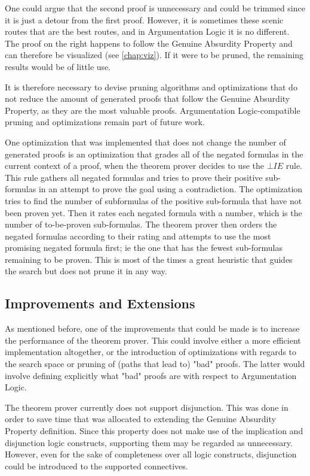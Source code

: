 \documentclass[11pt,twoside,a4paper]{report}
\begin{document}
One could argue that the second proof is unnecessary and could be trimmed since it is just a detour from the first proof. However, it is sometimes these scenic routes that are the best routes, and in Argumentation Logic it is no different. The proof on the right happens to follow the Genuine Absurdity Property and can therefore be visualized (see \autoref{chap:viz}). If it were to be pruned, the remaining results would be of little use.

It is therefore necessary to devise pruning algorithms and optimizations that do not reduce the amount of generated proofs that follow the Genuine Absurdity Property, as they are the most valuable proofs. Argumentation Logic-compatible pruning and optimizations remain part of future work.

One optimization that was implemented that does not change the number of generated proofs is an optimization that grades all of the negated formulas in the current context of a proof, when the theorem prover decides to use the $\bot IE$ rule. This rule gathers all negated formulas and tries to prove their positive sub-formulas in an attempt to prove the goal using a contradiction. The optimization tries to find the number of subformulas of the positive sub-formula that have not been proven yet. Then it rates each negated formula with a number, which is the number of to-be-proven sub-formulas. The theorem prover then orders the negated formulas according to their rating and attempts to use the most promising negated formula first; ie the one that has the fewest sub-formulas remaining to be proven. This is most of the times a great heuristic that guides the search but does not prune it in any way. 

\subsection{Improvements and Extensions}
As mentioned before, one of the improvements that could be made is to increase the performance of the theorem prover. This could involve either a more efficient implementation altogether, or the introduction of optimizations with regards to the search space or pruning of (paths that lead to) "bad" proofs. The latter would involve defining explicitly what "bad" proofs are with respect to Argumentation Logic.

The theorem prover currently does not support disjunction. This was done in order to save time that was allocated to extending the Genuine Absurdity Property definition. Since this property does not make use of the implication and disjunction logic constructs, supporting them may be regarded as unnecessary. However, even for the sake of completeness over all logic constructs, disjunction could be introduced to the supported connectives.
\end{document}
